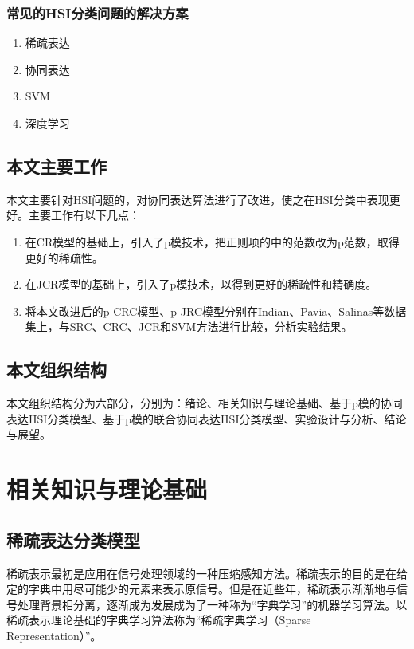 \documentclass[12pt,a4paper]{article}
\begin{document}
\subsubsection{常见的HSI分类问题的解决方案}


\begin{enumerate}
\item 稀疏表达
\item 协同表达
\item SVM
\item 深度学习
\end{enumerate}


\subsection{本文主要工作}
本文主要针对HSI问题的，对协同表达算法进行了改进，使之在HSI分类中表现更好。主要工作有以下几点：
\begin{enumerate}[(1)]
\item 在CR模型的基础上，引入了p模技术，把正则项的中的范数改为p范数，取得更好的稀疏性。
\item 在JCR模型的基础上，引入了p模技术，以得到更好的稀疏性和精确度。
\item 将本文改进后的p-CRC模型、p-JRC模型分别在Indian、Pavia、Salinas等数据集上，与SRC、CRC、JCR和SVM方法进行比较，分析实验结果。
\end{enumerate}

\subsection{本文组织结构}
本文组织结构分为六部分，分别为：绪论、相关知识与理论基础、基于p模的协同表达HSI分类模型、基于p模的联合协同表达HSI分类模型、实验设计与分析、结论与展望。






\section{相关知识与理论基础}
\subsection{稀疏表达分类模型}
稀疏表示最初是应用在信号处理领域的一种压缩感知方法。稀疏表示的目的是在给定的字典中用尽可能少的元素来表示原信号。但是在近些年，稀疏表示渐渐地与信号处理背景相分离，逐渐成为发展成为了一种称为“字典学习”的机器学习算法。以稀疏表示理论基础的字典学习算法称为“稀疏字典学习（Sparse Representation）”。
\end{document}
